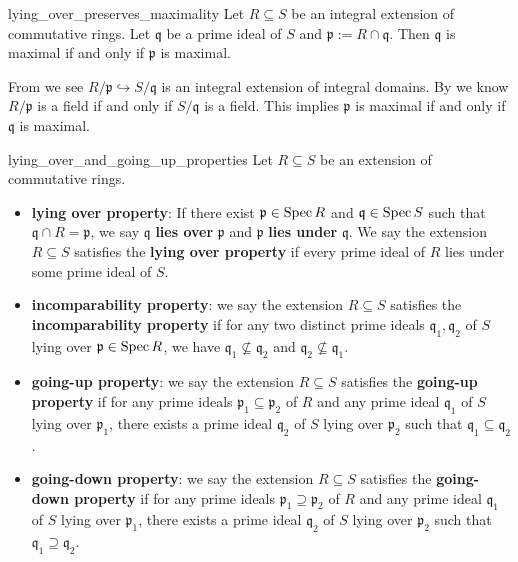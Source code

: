 \begin{corollary}{}{lying_over_preserves_maximality}
    Let $R\subseteq S$ be an integral extension of commutative rings. Let $\mathfrak{q}$ be a prime ideal of $S$ and $\mathfrak{p}:=R\cap \mathfrak{q}$. Then  $\mathfrak{q}$ is maximal if and only if $\mathfrak{p}$ is maximal.
\end{corollary}
\begin{prf}
    From  we see $ R/\mathfrak{p}\hookrightarrow S/\mathfrak{q}$ is an integral extension of integral domains. By  we know $R/\mathfrak{p}$ is a field if and only if $S/\mathfrak{q}$ is a field. This implies $\mathfrak{p}$ is maximal if and only if $\mathfrak{q}$ is maximal.
\end{prf}

\begin{definition}{}{lying_over_and_going_up_properties}
    Let $R\subseteq S$ be an extension of commutative rings.
    \begin{itemize}
        \item \textbf{lying over property}: If there exist $\mathfrak{p}\in \operatorname{Spec} R$ and $\mathfrak{q}\in \operatorname{Spec} S$ such that $\mathfrak{q}\cap R=\mathfrak{p}$, we say $\mathfrak{q}$ \textbf{lies over} $\mathfrak{p}$ and $\mathfrak{p}$ \textbf{lies under} $\mathfrak{q}$. We say the extension $R\subseteq S$ satisfies the \textbf{lying over property} if every prime ideal of $R$ lies under some prime ideal of $S$.
        \item \textbf{incomparability property}: we say the extension $R\subseteq S$ satisfies the \textbf{incomparability property} if for any two distinct prime ideals $\mathfrak{q}_1, \mathfrak{q}_2$ of $S$ lying over  $\mathfrak{p}\in \operatorname{Spec} R$, we have $\mathfrak{q}_1\not\subseteq \mathfrak{q}_2$ and $\mathfrak{q}_2\not\subseteq \mathfrak{q}_1$.
        \item \textbf{going-up property}: we say the extension $R\subseteq S$ satisfies the \textbf{going-up property} if for any prime ideals $\mathfrak{p}_1\subseteq \mathfrak{p}_2$ of $R$ and any prime ideal $\mathfrak{q}_1$ of $S$ lying over $\mathfrak{p}_1$, there exists a prime ideal $\mathfrak{q}_2$ of $S$ lying over $\mathfrak{p}_2$ such that $\mathfrak{q}_1\subseteq \mathfrak{q}_2$.
        \item \textbf{going-down property}: we say the extension $R\subseteq S$ satisfies the \textbf{going-down property} if for any prime ideals $\mathfrak{p}_1\supseteq \mathfrak{p}_2$ of $R$ and any prime ideal $\mathfrak{q}_1$ of $S$ lying over $\mathfrak{p}_1$, there exists a prime ideal $\mathfrak{q}_2$ of $S$ lying over $\mathfrak{p}_2$ such that $\mathfrak{q}_1\supseteq \mathfrak{q}_2$.
    \end{itemize}
\end{definition}

